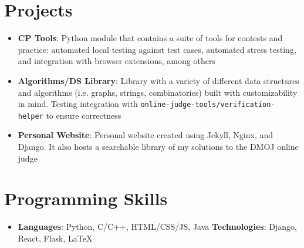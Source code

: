 \documentclass[letterpaper,11pt]{article}
\newcommand{\resumeItem}[2]{
  \item\small{
    \textbf{#1}{: #2 \vspace{-2pt}}
  }
}
\newcommand{\resumeSubItem}[2]{\resumeItem{#1}{#2}\vspace{-4pt}}
\newcommand{\resumeSubHeadingListStart}{\begin{itemize}[leftmargin=*]}
\newcommand{\resumeSubHeadingListEnd}{\end{itemize}}
\newcommand{\code}[1]{\colorbox{light-gray}{\texttt{#1}}}
\begin{document}
\section{Projects}
  \resumeSubHeadingListStart
    \resumeSubItem{CP Tools}
      {Python module that contains a suite of tools for contests and practice: automated local testing against test cases, automated stress testing, and integration with browser extensions, among others}
    \resumeSubItem{Algorithms/DS Library}
      {Library with a variety of different data structures and algorithms (i.e. graphs, strings, combinatorics) built with customizability in mind.  Testing integration with \code{online-judge-tools/verification-helper} to ensure correctness}
    \resumeSubItem{Personal Website}
      {Personal website created using Jekyll, Nginx, and Django.  It also hosts a searchable library of my solutions to the DMOJ online judge}
  \resumeSubHeadingListEnd

%
\section{Programming Skills}
 \resumeSubHeadingListStart
   \item{
     \textbf{Languages}{: Python, C/C++, HTML/CSS/JS, Java}
     \hfill
     \textbf{Technologies}{: Django, React, Flask, LaTeX}
   }
 \resumeSubHeadingListEnd

\end{document}
